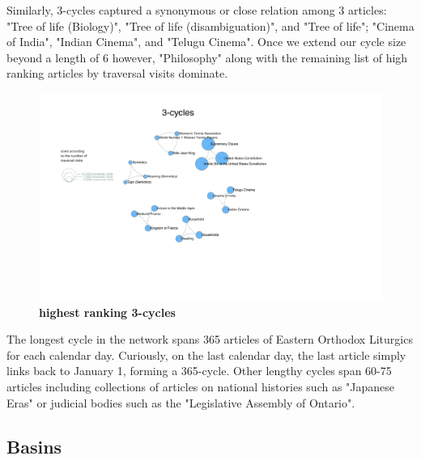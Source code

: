 \documentclass[pre,twocolumn,twoside,superscriptaddress,floatfix, aps, 10pt]{revtex4-1}
\begin{document}
Similarly, 3-cycles captured a synonymous or close relation among 3 articles: "Tree of life (Biology)", "Tree of life (disambiguation)", 
and "Tree of life"; "Cinema of India", "Indian Cinema", and "Telugu Cinema". Once we extend our cycle size beyond a length of 6 however, 
"Philosophy" along with the remaining list of high ranking articles by traversal visits dominate.

\begin{figure}[tp!]
  \centering	
  \includegraphics[width=\textwidth]{graphics/3_cycles.pdf}
  \caption{
    \textbf{highest ranking 3-cycles}
  }
  \label{fig:3-cycles}
\end{figure}

The longest cycle in the network spans 365 articles of Eastern Orthodox Liturgics for each calendar day. 
Curiously, on the last calendar day, the last article simply links back to January 1, forming a 365-cycle.
Other lengthy cycles span 60-75 articles including collections of articles on national histories such as "Japanese Eras" 
or judicial bodies such as the "Legislative Assembly of Ontario".





\subsection{Basins}
\end{document}
